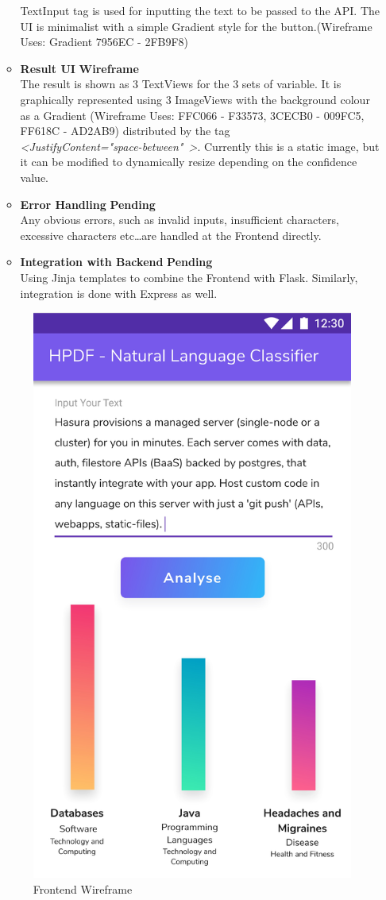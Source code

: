 \documentclass[12pt]{article}
\newcommand\hash{\scalebox{0.8}{\raisebox{0.4ex}{\#}}}
\begin{document}
\begin{itemize}
\begin{itemize}
				TextInput tag is used for inputting the text to be passed to the API.
				The UI is minimalist with a simple Gradient style for the button.(Wireframe Uses: Gradient \hash 7956EC - \hash 2FB9F8) 
			\item \textbf{Result UI} \hfill \textbf{Wireframe} \\
				The result is shown as 3 TextViews for the 3 sets of variable. It is graphically represented using 3 ImageViews with the background colour as a Gradient (Wireframe Uses: \hash FFC066 - \hash F33573, \hash 3CECB0 - \hash 009FC5, \hash FF618C - \hash AD2AB9)
				distributed by the tag \\ \mbox{\emph{\textless JustifyContent="space-between" \textgreater}}. Currently this is a static image, but it can be modified to dynamically resize depending on the confidence value.
			\item \textbf{Error Handling} \hfill \textbf{Pending} \\
				Any obvious errors, such as invalid inputs, insufficient characters, excessive characters etc\ldots are handled at the Frontend directly.
			\item \textbf{Integration with Backend} \hfill \textbf{Pending} \\
				Using Jinja templates to combine the Frontend with Flask. Similarly, integration is done with Express as well.

		\end{itemize}
		\begin{figure}
			\centering
			\includegraphics[width=0.6\linewidth]{wireframe.jpeg}
			\caption{Frontend Wireframe}
		\end{figure}

\end{itemize}
\end{document}
